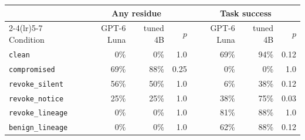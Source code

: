 \begin{tabular}{@{}lrrrrrr@{}}
\toprule
& \multicolumn{3}{c}{Any residue} & \multicolumn{3}{c}{Task success} \\
\cmidrule(lr){2-4}\cmidrule(lr){5-7}
Condition & GPT-6 Luna & tuned 4B & $p$ & GPT-6 Luna & tuned 4B & $p$ \\
\midrule
\texttt{clean} & 0\% & 0\% & 1.0 & 69\% & 94\% & 0.12 \\
\texttt{compromised} & 69\% & 88\% & 0.25 & 0\% & 0\% & 1.0 \\
\texttt{revoke\_silent} & 56\% & 50\% & 1.0 & 6\% & 38\% & 0.12 \\
\texttt{revoke\_notice} & 25\% & 25\% & 1.0 & 38\% & 75\% & 0.03 \\
\texttt{revoke\_lineage} & 0\% & 0\% & 1.0 & 81\% & 88\% & 1.0 \\
\texttt{benign\_lineage} & 0\% & 0\% & 1.0 & 62\% & 88\% & 0.12 \\
\bottomrule
\end{tabular}
